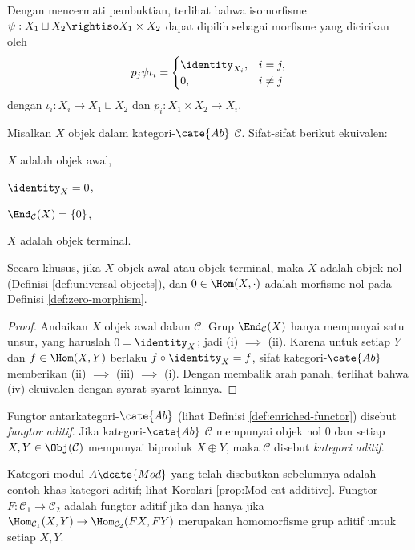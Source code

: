 \begin{remark}
	Dengan mencermati pembuktian, terlihat bahwa isomorfisme $\psi: X_1 \sqcup X_2 \rightiso X_1 \times X_2$ dapat dipilih sebagai morfisme yang dicirikan oleh
	\[ p_j \psi \iota_i =
		\begin{cases}
			\identity_{X_i}, & i=j, \\
			0, & i \neq j
		\end{cases} \]
	dengan $\iota_i : X_i \to X_1 \sqcup X_2$ dan $p_i: X_1 \times X_2 \to X_i$.
\end{remark}

\begin{lemma}
	Misalkan $X$ objek dalam kategori-$\cate{Ab}$ $\mathcal{C}$. Sifat-sifat berikut ekuivalen:
	\begin{compactenum}[(i)]
		\item $X$ adalah objek awal,
		\item $\identity_X = 0$,
		\item $\End_{\mathcal{C}}(X) = \{0\}$,
		\item $X$ adalah objek terminal.
	\end{compactenum}
	Secara khusus, jika $X$ objek awal atau objek terminal, maka $X$ adalah objek nol (Definisi \ref{def:universal-objects}), dan $0 \in \Hom(X, \cdot)$ adalah morfisme nol pada Definisi \ref{def:zero-morphism}.
\end{lemma}
\begin{proof}
	Andaikan $X$ objek awal dalam $\mathcal{C}$. Grup $\End_{\mathcal{C}}(X)$ hanya mempunyai satu unsur, yang haruslah $0 = \identity_X$; jadi (i) $\implies$ (ii). Karena untuk setiap $Y$ dan $f \in \Hom(X, Y)$ berlaku $f \circ \identity_X = f$, sifat kategori-$\cate{Ab}$ memberikan (ii) $\implies$ (iii) $\implies$ (i). Dengan membalik arah panah, terlihat bahwa (iv) ekuivalen dengan syarat-syarat lainnya.
\end{proof}

\begin{definition}\label{def:additive-cat}
	Fungtor antarkategori-$\cate{Ab}$ (lihat Definisi \ref{def:enriched-functor}) disebut \emph{fungtor aditif}. Jika kategori-$\cate{Ab}$ $\mathcal{C}$ mempunyai objek nol $0$ dan setiap $X, Y \in \Obj(\mathcal{C})$ mempunyai biproduk $X \oplus Y$, maka $\mathcal{C}$ disebut \emph{kategori aditif}. 
\end{definition}

Kategori modul $A\dcate{Mod}$ yang telah disebutkan sebelumnya adalah contoh khas kategori aditif; lihat Korolari \ref{prop:Mod-cat-additive}. Fungtor $F: \mathcal{C}_1 \to \mathcal{C}_2$ adalah fungtor aditif jika dan hanya jika $\Hom_{\mathcal{C}_1}(X, Y) \to \Hom_{\mathcal{C}_2}(FX, FY)$ merupakan homomorfisme grup aditif untuk setiap $X, Y$.

